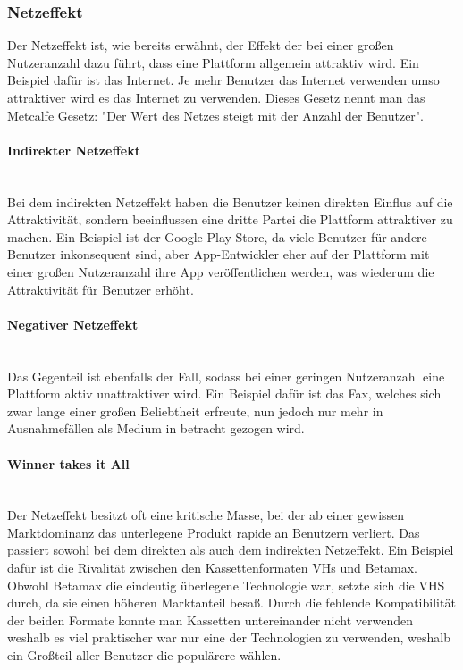 \documentclass{article}
\newcommand{\paragraphlb}[1]{\paragraph{#1}\mbox{}\\}
\begin{document}
		\subsubsection{Netzeffekt}
		Der Netzeffekt ist, wie bereits erwähnt, der Effekt der bei einer großen Nutzeranzahl dazu führt, dass eine Plattform allgemein attraktiv wird. Ein Beispiel dafür ist das Internet. Je mehr Benutzer das Internet verwenden umso attraktiver wird es das Internet zu verwenden. Dieses Gesetz nennt man das Metcalfe Gesetz: "Der Wert des Netzes steigt mit der Anzahl der Benutzer".
		\paragraphlb{Indirekter Netzeffekt}
		Bei dem indirekten Netzeffekt haben die Benutzer keinen direkten Einflus auf die Attraktivität, sondern beeinflussen eine dritte Partei die Plattform attraktiver zu machen. Ein Beispiel ist der Google Play Store, da viele Benutzer für andere Benutzer inkonsequent sind, aber App-Entwickler eher auf der Plattform mit einer großen Nutzeranzahl ihre App veröffentlichen werden, was wiederum die Attraktivität für Benutzer erhöht. \\
		\paragraphlb{Negativer Netzeffekt}
		Das Gegenteil ist ebenfalls der Fall, sodass bei einer geringen Nutzeranzahl eine Plattform aktiv unattraktiver wird. Ein Beispiel dafür ist das Fax, welches sich zwar lange einer großen Beliebtheit erfreute, nun jedoch nur mehr in Ausnahmefällen als Medium in betracht gezogen wird.
		\paragraphlb{Winner takes it All}
		Der Netzeffekt besitzt oft eine kritische Masse, bei der ab einer gewissen Marktdominanz das unterlegene Produkt rapide an Benutzern verliert. Das passiert sowohl bei dem direkten als auch dem indirekten Netzeffekt. Ein Beispiel dafür ist die Rivalität zwischen den Kassettenformaten VHs und Betamax. Obwohl Betamax die eindeutig überlegene Technologie war, setzte sich die VHS durch, da sie einen höheren Marktanteil besaß. Durch die fehlende Kompatibilität der beiden Formate konnte man Kassetten untereinander nicht verwenden weshalb es viel praktischer war nur eine der Technologien zu verwenden, weshalb ein Großteil aller Benutzer die populärere wählen.
\end{document}
